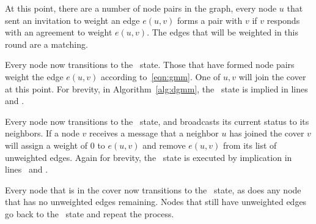 At this point, there are a number of node pairs in the graph, every node $u$ that sent an invitation to weight an edge $e(u,v)$ forms a pair with $v$ if $v$ responds with an agreement to weight $e(u,v)$. The edges that will be weighted in this round are a matching.

Every node now transitions to the \cUd\ state. Those that have formed node pairs weight the edge $e(u,v)$ according to~\eqref{eqn:gmm}. One of $u,v$ will join the cover at this point. For brevity, in Algorithm~\ref{alg:dgmm}, the \cUd\ state is implied in lines~ and .

Every node now transitions to the \cEd\ state, and broadcasts its current status to its neighbors. If a node $v$ receives a message that a neighbor $u$ has joined the cover $v$ will assign a weight of 0 to $e(u,v)$ and remove $e(u,v)$ from its list of unweighted edges. Again for brevity, the \cEd\ state is executed by implication in lines~ and .

Every node that is in the cover now transitions to the \cDd\ state, as does any node that has no unweighted edges remaining. Nodes that still have unweighted edges go back to the \cCd\ state and repeat the process. 

